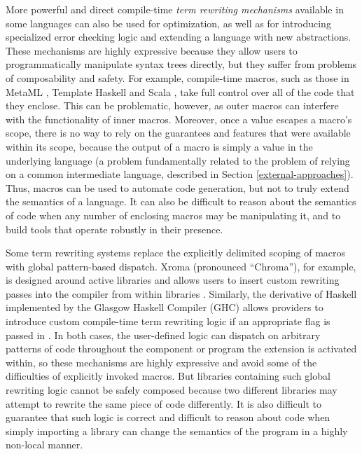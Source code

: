 More powerful and direct compile-time \emph{term rewriting mechanisms} available in some languages can also be used for optimization, as well as for introducing specialized error checking logic and extending a language with new abstractions. These mechanisms are highly expressive because they allow users to programmatically manipulate syntax trees directly, but they suffer from problems of composability and safety. For example, compile-time macros, such as those in MetaML \cite{Sheard:1999:UMS}, Template Haskell \cite{SheardPeytonJones:Haskell-02} and Scala \cite{scala-macros}, take full control over all of the code that they enclose. This can be problematic, however, as outer macros can interfere with the functionality of inner macros. Moreover, once a value escapes a macro's scope, there is no way to rely on the guarantees and features that were available within its scope, because the output of a macro is simply a value in the underlying language (a problem fundamentally related to the problem of relying on a common intermediate language,  described in Section \ref{external-approaches}). Thus, macros can be used to automate code generation, but not to truly extend the semantics of a language. It can also be difficult to reason about the semantics of code when any number of enclosing macros may be manipulating it, and to build tools that operate robustly in their presence.

Some term rewriting systems replace the explicitly delimited scoping of macros with global pattern-based dispatch. Xroma (pronounced ``Chroma''), for example, is designed around active libraries and allows users to insert custom rewriting passes into the compiler from within libraries \cite{activelibraries}. Similarly, the derivative of Haskell implemented by the Glasgow Haskell Compiler (GHC) allows providers to introduce custom compile-time term rewriting logic if an appropriate flag is passed in \cite{jones2001playing}. In both cases, the user-defined logic can dispatch on arbitrary patterns of code throughout the component or program the extension is activated within, so these mechanisms are highly expressive and avoid some of the difficulties of explicitly invoked macros. But libraries containing such global rewriting logic cannot be safely composed because two different libraries may attempt to rewrite the same piece of code differently. It is also difficult to guarantee that such logic is correct and difficult to reason about code when simply importing a library can change the semantics of the program in a highly non-local manner.


